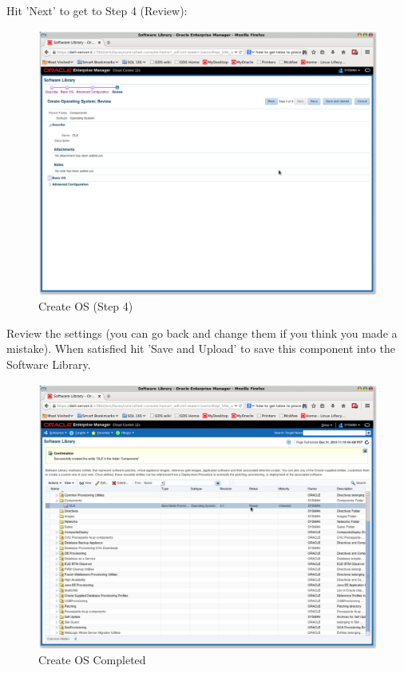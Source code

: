 \documentclass[11pt]{article}
\begin{document}
Hit 'Next' to get to Step 4 (Review):
\begin{figure}[htb]
\centering
\includegraphics[width=.9\linewidth]{./images/Create_OS_4.png}
\caption{Create OS (Step 4)}
\end{figure}
\clearpage

Review the settings (you can go back and change them if you think you made a mistake). When satisfied hit 'Save and Upload' to save this component into the Software Library. 
\begin{figure}[htb]
\centering
\includegraphics[width=.9\linewidth]{./images/Create_OS_Completed.png}
\caption{Create OS Completed}
\end{figure}
\clearpage
\end{document}
